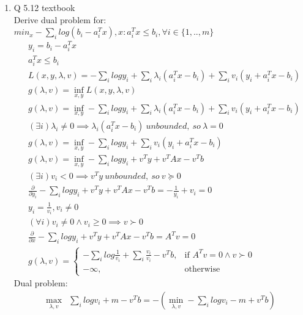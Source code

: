 \documentclass[12pt,letter]{article}
\begin{document}


\begin{enumerate}
\item Q 5.12 textbook\\
  Derive dual problem for: $min_x - \sum_i log(b_i-a_i^Tx), x: a_i^Tx \leq b_i, \forall i \in \{1,..,m\}$
  \begin{align*}
    &y_i = b_i-a_i^Tx\\
    &a_i^Tx \leq b_i\\
    &L(x,y,\lambda,v)=-\sum_i log y_i + \sum_i \lambda_i(a_i^Tx-b_i) + \sum_i v_i(y_i+a_i^Tx-b_i)\\
    &g(\lambda,v)=\inf_{x,y} L(x,y,\lambda,v)\\
    &g(\lambda,v)=\inf_{x,y}-\sum_i log y_i + \sum_i \lambda_i(a_i^Tx-b_i) + \sum_i v_i(y_i+a_i^Tx-b_i)\\
    &(\exists i)\lambda_i \neq 0 \implies \lambda_i(a_i^Tx-b_i)\ unbounded,\ so\ \lambda = 0\\
    &g(\lambda,v)=\inf_{x,y}-\sum_i log y_i + \sum_i v_i(y_i+a_i^Tx-b_i)\\
    &g(\lambda,v)=\inf_{x,y}-\sum_i log y_i + v^Ty + v^TAx - v^Tb\\
    &(\exists i)v_i < 0 \implies v^Ty\ unbounded,\ so\ v \succeq 0\\
    &\frac{\partial}{\partial y_i}-\sum_i log y_i + v^Ty + v^TAx - v^Tb=-\frac{1}{y_i} + v_i=0\\
    &y_i = \frac{1}{v_i}, v_i \neq 0\\
    &(\forall i) v_i \neq 0 \wedge v_i \geq 0 \implies v \succ 0\\
    &\frac{\partial}{\partial x}-\sum_i log y_i + v^Ty + v^TAx - v^Tb=A^Tv=0\\
    &g(\lambda,v)=
      \begin{cases}
        -\sum_i log \frac{1}{v_i} + \sum_i \frac{v_i}{v_i} - v^Tb, & \text{if } A^Tv=0 \wedge v \succ 0\\
        -\infty, & \text{otherwise}
      \end{cases}
  \end{align*}
  Dual problem:
  \begin{align*}
    \max_{\lambda,v} &\sum_i log v_i + m - v^Tb = -(\min_{\lambda,v}-\sum_i log v_i - m + v^Tb)\\

\end{align*}
\end{enumerate}
\end{document}
